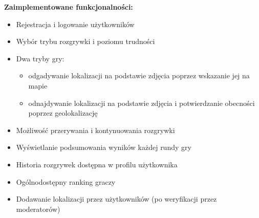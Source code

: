 \textbf{Zaimplementowane funkcjonalności:}
\begin{itemize}
    \item Rejestracja i logowanie użytkowników
    \item Wybór trybu rozgrywki i poziomu trudności
    \item Dwa tryby gry:
    \begin{itemize}
        \item odgadywanie lokalizacji na podstawie zdjęcia poprzez wskazanie jej na mapie
        \item odnajdywanie lokalizacji na podstawie zdjęcia i potwierdzanie obecności poprzez geolokalizację
    \end{itemize}
    \item Możliwość przerywania i kontynuowania rozgrywki
    \item Wyświetlanie podsumowania wyników każdej rundy gry
    \item Historia rozgrywek dostępna w profilu użytkownika
    \item Ogólnodostępny ranking graczy
    \item Dodawanie lokalizacji przez użytkowników (po weryfikacji przez moderatorów)
\end{itemize}
